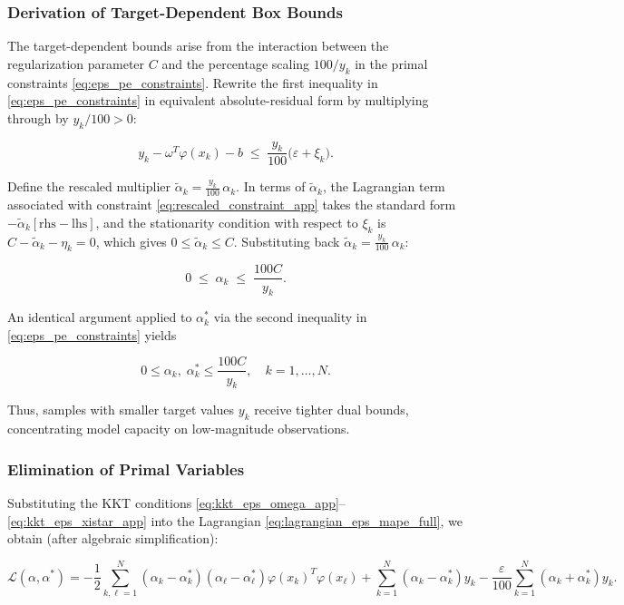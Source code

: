 \documentclass[mathematics,article,submit,pdftex,moreauthors]{Definitions/mdpi}
\begin{document}
\subsubsection{Derivation of Target-Dependent Box Bounds}

The target-dependent bounds arise from the interaction between the regularization
parameter $C$ and the percentage scaling $100/y_k$ in the primal constraints
\eqref{eq:eps_pe_constraints}.
Rewrite the first inequality in \eqref{eq:eps_pe_constraints} in equivalent
absolute-residual form by multiplying through by $y_k/100 > 0$:
\begin{linenomath}
\begin{equation}\label{eq:rescaled_constraint_app}
y_k - \omega^T\varphi(x_k) - b \;\leq\; \frac{y_k}{100}\bigl(\varepsilon + \xi_k\bigr).
\end{equation}
\end{linenomath}
Define the rescaled multiplier $\tilde{\alpha}_k = \frac{y_k}{100}\,\alpha_k$.
In terms of $\tilde{\alpha}_k$, the Lagrangian term associated with constraint
\eqref{eq:rescaled_constraint_app} takes the standard form $-\tilde{\alpha}_k[\text{rhs} - \text{lhs}]$,
and the stationarity condition with respect to $\xi_k$ is
$C - \tilde{\alpha}_k - \eta_k = 0$, which gives $0 \le \tilde{\alpha}_k \le C$.
Substituting back $\tilde{\alpha}_k = \frac{y_k}{100}\,\alpha_k$:
\begin{linenomath}
\begin{equation}\label{eq:box_bound_derivation_app}
0 \;\leq\; \alpha_k \;\leq\; \frac{100C}{y_k}.
\end{equation}
\end{linenomath}
An identical argument applied to $\alpha_k^*$ via the second inequality in
\eqref{eq:eps_pe_constraints} yields
\begin{linenomath}
\begin{equation}\label{eq:box_bound_both_app}
0 \leq \alpha_k,\;\alpha_k^* \leq \frac{100C}{y_k}, \quad k=1,\ldots,N.
\end{equation}
\end{linenomath}
Thus, samples with smaller target values $y_k$ receive tighter dual bounds,
concentrating model capacity on low-magnitude observations.

\subsubsection{Elimination of Primal Variables}

Substituting the KKT conditions \eqref{eq:kkt_eps_omega_app}--\eqref{eq:kkt_eps_xistar_app} 
into the Lagrangian \eqref{eq:lagrangian_eps_mape_full}, we obtain (after algebraic simplification):
\begin{linenomath}
\begin{equation}\label{eq:dual_intermediate_eps_app}
\mathcal{L}(\alpha, \alpha^*) = -\frac{1}{2}\sum_{k,\ell=1}^N (\alpha_k - \alpha_k^*)(\alpha_\ell - \alpha_\ell^*) \varphi(x_k)^T\varphi(x_\ell)
+ \sum_{k=1}^N (\alpha_k - \alpha_k^*) y_k - \frac{\varepsilon}{100}\sum_{k=1}^N (\alpha_k + \alpha_k^*) y_k.
\end{equation}
\end{linenomath}
\end{document}
